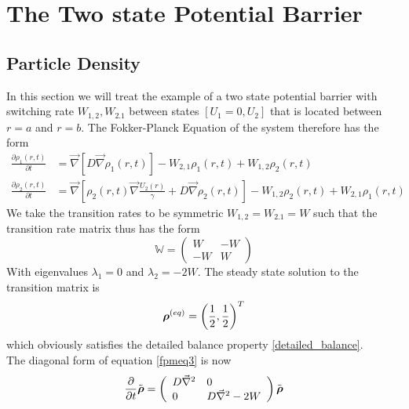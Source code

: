 \section{The Two state Potential Barrier}

\subsection{Particle Density}
In this section we will treat the example of a two state potential barrier with switching rate $W_{1,2}, W_{2.1}$ between states $[U_1=0,U_2]$ that is located between $r = a$ and $r = b$. The Fokker-Planck Equation of the system therefore has the form
\begin{align}
    \frac{\partial \rho_1(r,t)}{\partial t} &= \vec \nabla \left[ D \vec \nabla \rho_1(r,t) \right] - W_{2,1}\rho_1(r,t) + W_{1,2}\rho_2(r,t) \nonumber \\
    \frac{\partial \rho_2(r,t)}{\partial t} &= \vec \nabla \left[\rho_2(r,t) \vec \nabla \frac{U_2(r)}{\gamma} + D \vec \nabla \rho_2(r,t) \right] - W_{1,2}\rho_2(r,t) + W_{2,1}\rho_1(r,t)
    \label{two_state_fpe}
\end{align}
We take the transition rates to be symmetric $W_{1,2} = W_{2.1} = W$ such that the transition rate matrix thus has the form 
\begin{equation}
    \mathbb{W} = \left( \begin{array}{rr}
    W & -W \\
    -W & W 
\end{array} \right)
    \label{two_state_transition_matrix}
\end{equation}
With eigenvalues $\lambda_1 = 0$ and $\lambda_2 = -2W$. The steady state solution to the transition matrix is 
\begin{equation}
    \boldsymbol{\mathbf{\rho}}^{(eq)}=\left(\frac{1}{2}, \frac{1}{2}\right)^{T}
    \label{rhoeq}
\end{equation}
which obviously satisfies the detailed balance property \eqref{detailed_balance}. \\
The diagonal form of equation \eqref{fpmeq3} is now 
\begin{equation}
    \frac{\partial}{\partial t} \tilde{\boldsymbol{\mathbf{\rho}}} = \left( \begin{array}{ll}
        D\vec{\nabla}^{2} & 0 \\
        0 & D\vec{\nabla}^{2} - 2W
    \end{array} \right) \tilde{\boldsymbol{\mathbf{\rho}}}
    \label{fpmeq5}
\end{equation}

